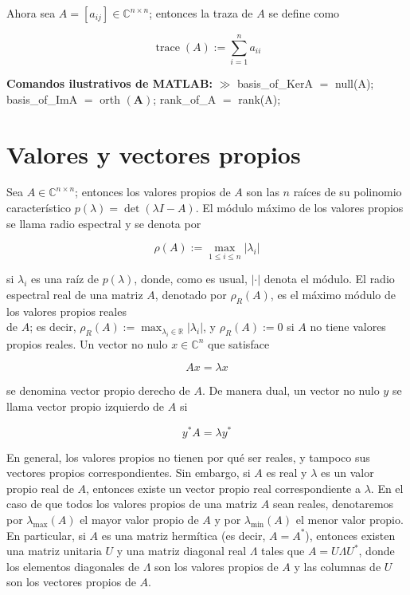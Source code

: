 Ahora sea $A=\left[a_{i j}\right] \in \mathbb{C}^{n \times n}$; entonces la traza de $A$ se define como

$$
\operatorname{trace}(A):=\sum_{i=1}^{n} a_{i i}
$$

\textbf{Comandos ilustrativos de MATLAB:}
$\gg$ basis\_of\_KerA $=$ null(A); basis\_of\_ImA $=$ orth $(\mathbf{A})$; rank\_of\_A $=$ rank(A);

\section{Valores y vectores propios}
Sea $A \in \mathbb{C}^{n \times n}$; entonces los valores propios de $A$ son las $n$ raíces de su polinomio característico $p(\lambda)=\operatorname{det}(\lambda I-A)$. El módulo máximo de los valores propios se llama radio espectral y se denota por

$$
\rho(A):=\max _{1 \leq i \leq n}\left|\lambda_{i}\right|
$$

si $\lambda_{i}$ es una raíz de $p(\lambda)$, donde, como es usual, $|\cdot|$ denota el módulo. El radio espectral real de una matriz $A$, denotado por $\rho_{R}(A)$, es el máximo módulo de los valores propios reales\\
de $A$; es decir, $\rho_{R}(A):=\max _{\lambda_{i} \in \mathbb{R}}\left|\lambda_{i}\right|$, y $\rho_{R}(A):=0$ si $A$ no tiene valores propios reales. Un vector no nulo $x \in \mathbb{C}^{n}$ que satisface

$$
A x=\lambda x
$$

se denomina vector propio derecho de $A$. De manera dual, un vector no nulo $y$ se llama vector propio izquierdo de $A$ si

$$
y^{*} A=\lambda y^{*}
$$

En general, los valores propios no tienen por qué ser reales, y tampoco sus vectores propios correspondientes. Sin embargo, si $A$ es real y $\lambda$ es un valor propio real de $A$, entonces existe un vector propio real correspondiente a $\lambda$. En el caso de que todos los valores propios de una matriz $A$ sean reales, denotaremos por $\lambda_{\max }(A)$ el mayor valor propio de $A$ y por $\lambda_{\min }(A)$ el menor valor propio. En particular, si $A$ es una matriz hermítica (es decir, $A=A^{*}$), entonces existen una matriz unitaria $U$ y una matriz diagonal real $\Lambda$ tales que $A=U \Lambda U^{*}$, donde los elementos diagonales de $\Lambda$ son los valores propios de $A$ y las columnas de $U$ son los vectores propios de $A$.

